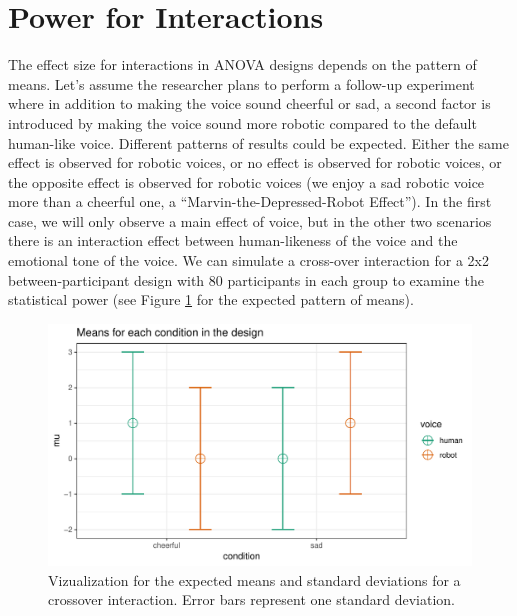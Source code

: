 \documentclass[,jou,floatsintext]{apa6}
\begin{document}
\hypertarget{power-for-interactions}{%
\section{Power for Interactions}\label{power-for-interactions}}

The effect size for interactions in ANOVA designs depends on the pattern of means.
Let's assume the researcher plans to perform a follow-up experiment where in addition to making the voice sound cheerful or sad, a second factor is introduced by making the voice sound more robotic compared to the default human-like voice.
Different patterns of results could be expected.
Either the same effect is observed for robotic voices, or no effect is observed for robotic voices, or the opposite effect is observed for robotic voices (we enjoy a sad robotic voice more than a cheerful one, a \enquote{Marvin-the-Depressed-Robot Effect}).
In the first case, we will only observe a main effect of voice, but in the other two scenarios there is an interaction effect between human-likeness of the voice and the emotional tone of the voice.
We can simulate a cross-over interaction for a 2x2 between-participant design with 80 participants in each group to examine the statistical power (see Figure \ref{fig:mean-plot} for the expected pattern of means).

\begin{figure}
\centering
\includegraphics{0.1_Simulation_Based_Power_Analysis_For_Factorial_ANOVA_Designs_files/figure-latex/mean-plot-1.pdf}
\caption{\label{fig:mean-plot}Vizualization for the expected means and standard deviations for a crossover interaction. Error bars represent one standard deviation.}
\end{figure}
\end{document}
